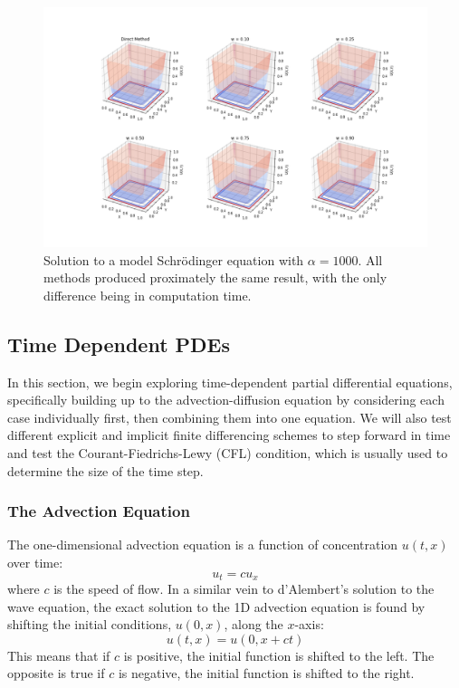 \documentclass[twocolumn]{article}
\begin{document}
\begin{figure}[t]
	\centering
	\includegraphics[width=\textwidth]{schroe_alpha_1000}
	\caption{Solution to a model Schr\"{o}dinger equation with $\alpha=1000$. All methods produced proximately the same result, with the only difference being in computation time.}
	\label{fig:schroe_alpha_1000}
\end{figure}

\subsection{Time Dependent PDEs}

In this section, we begin exploring time-dependent partial
differential equations, specifically building up to the
advection-diffusion equation by considering each case individually
first, then combining them into one equation. We will also test
different explicit and implicit finite differencing schemes to step
forward in time and test the Courant-Fiedrichs-Lewy (CFL) condition,
which is usually used to determine the size of the time step.

\subsubsection{The Advection Equation}

The one-dimensional advection equation is a function of
concentration $u(t, x)$ over time:
\begin{equation}
u_t = c u_x
\end{equation}
where $c$ is the speed of flow. In a similar vein to d'Alembert's
solution to the wave equation, the exact solution to the 1D advection
equation is found by shifting the initial conditions, $u(0, x)$, along
the $x$-axis:
\begin{equation}
u(t, x) = u(0, x + ct)
\end{equation}
This means that if $c$ is positive, the initial function is shifted to
the left. The opposite is true if $c$ is negative, the initial
function is shifted to the right.
\end{document}
